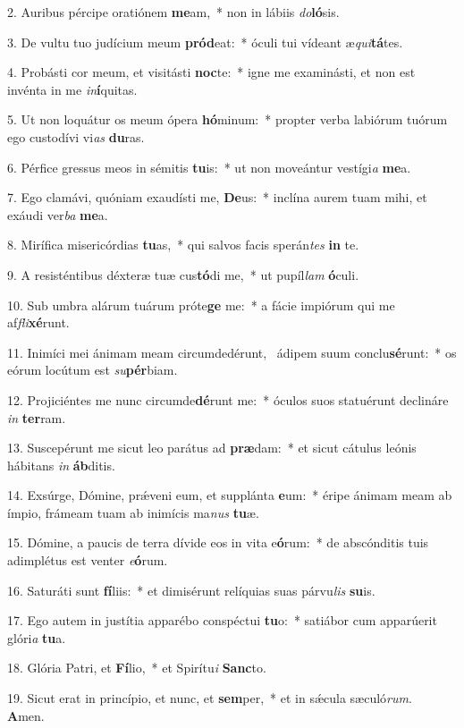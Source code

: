 2. Auribus pércipe oratiónem \textbf{me}am,~*  non in lábiis \textit{do}\textbf{ló}sis.\

3. De vultu tuo judícium meum \textbf{pród}eat:~*  óculi tui vídeant æ\textit{qui}\textbf{tá}tes.\

4. Probásti cor meum, et visitásti \textbf{noc}te:~*  igne me examinásti, et non est invénta in me \textit{in}\textbf{í}quitas.\

5. Ut non loquátur os meum ópera \textbf{hó}minum:~*  propter verba labiórum tuórum ego custodívi vi\textit{as} \textbf{du}ras.\

6. Pérfice gressus meos in sémitis \textbf{tu}is:~*  ut non moveántur vestígi\textit{a} \textbf{me}a.\

7. Ego clamávi, quóniam exaudísti me, \textbf{De}us:~*  inclína aurem tuam mihi, et exáudi ver\textit{ba} \textbf{me}a.\

8. Mirífica misericórdias \textbf{tu}as,~*  qui salvos facis sperán\textit{tes} \textbf{in} te.\

9. A resisténtibus déxteræ tuæ cus\textbf{tó}di me,~*  ut pupíl\textit{lam} \textbf{ó}culi.\

10. Sub umbra alárum tuárum próte\textbf{ge} me:~*  a fácie impiórum qui me af\textit{fli}\textbf{xé}runt.\

11. Inimíci mei ánimam meam circumdedérunt, \dag\  ádipem suum conclu\textbf{sé}runt:~*  os eórum locútum est \textit{su}\textbf{pér}biam.\

12. Projiciéntes me nunc circumde\textbf{dé}runt me:~*  óculos suos statuérunt declináre \textit{in} \textbf{ter}ram.\

13. Suscepérunt me sicut leo parátus ad \textbf{præ}dam:~*  et sicut cátulus leónis hábitans \textit{in} \textbf{áb}ditis.\

14. Exsúrge, Dómine, prǽveni eum, et supplánta \textbf{e}um:~*  éripe ánimam meam ab ímpio, frámeam tuam ab inimícis ma\textit{nus} \textbf{tu}æ.\

15. Dómine, a paucis de terra dívide eos in vita e\textbf{ó}rum:~*  de abscónditis tuis adimplétus est venter \textit{e}\textbf{ó}rum.\

16. Saturáti sunt \textbf{fí}liis:~*  et dimisérunt relíquias suas párvu\textit{lis} \textbf{su}is.\

17. Ego autem in justítia apparébo conspéctui \textbf{tu}o:~*  satiábor cum apparúerit glóri\textit{a} \textbf{tu}a.\

18. Glória Patri, et \textbf{Fí}lio,~*  et Spirítu\textit{i} \textbf{Sanc}to.\

19. Sicut erat in princípio, et nunc, et \textbf{sem}per,~*  et in sǽcula sæculó\textit{rum}. \textbf{A}men.\

